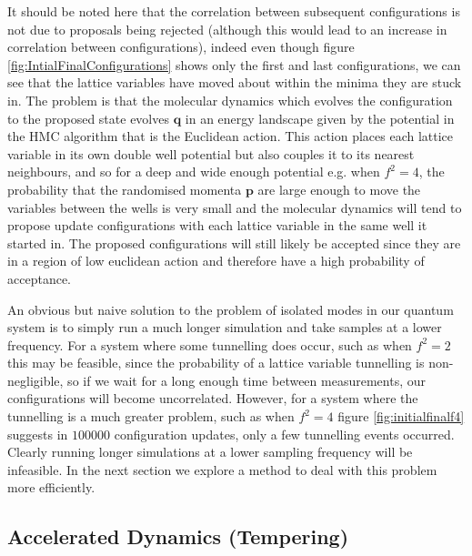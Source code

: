 \documentclass[12pt]{article}
\begin{document}
        It should be noted here that the correlation between subsequent configurations is not due to proposals being rejected (although this would lead to an increase in correlation between configurations), indeed even though figure \ref{fig:IntialFinalConfigurations} shows only the first and last configurations, we can see that the lattice variables have moved about within the minima they are stuck in. The problem is that the molecular dynamics which evolves the configuration to the proposed state evolves $\bm{q}$ in an energy landscape given by the potential in the HMC algorithm that is the Euclidean action. This action places each lattice variable in its own double well potential but also couples it to its nearest neighbours, and so for a deep and wide enough potential e.g. when $f^2=4$, the probability that the randomised momenta $\bm{p}$ are large enough to move the variables between the wells is very small and the molecular dynamics will tend to propose update configurations with each lattice variable in the same well it started in. The proposed configurations will still likely be accepted since they are in a region of low euclidean action and therefore have a high probability of acceptance.

        An obvious but naive solution to the problem of isolated modes in our quantum system is to simply run a much longer simulation and take samples at a lower frequency. For a system where some tunnelling does occur, such as when $f^2=2$ this may be feasible, since the probability of a lattice variable tunnelling is non-negligible, so if we wait for a long enough time between measurements, our configurations will become uncorrelated. However, for a system where the tunnelling is a much greater problem, such as when $f^2=4$ figure \ref{fig:initialfinalf4} suggests in $100000$ configuration updates, only a few tunnelling events occurred. Clearly running longer simulations at a lower sampling frequency will be infeasible. In the next section we explore a method to deal with this problem more efficiently.



    \label{sec:Tempering}
    \subsection{Accelerated Dynamics (Tempering)}
\end{document}
